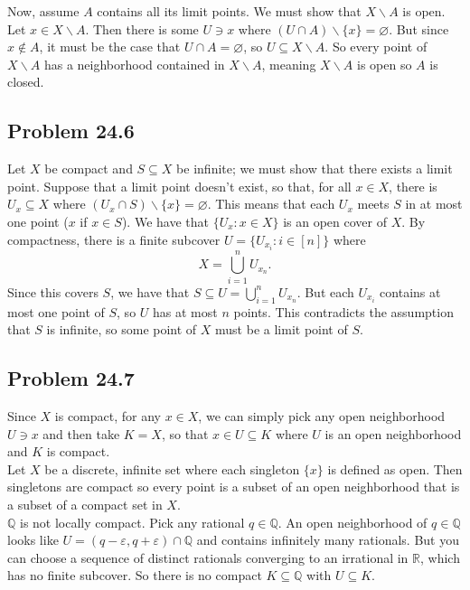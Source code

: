 \documentclass{article}
\newcommand{\R}{\mathbb{R}}
\newcommand{\Q}{\mathbb{Q}}
\newcommand{\eps}{\varepsilon}
\newcommand{\nullset}{\varnothing}
\newcommand{\minus}{\backslash}
\begin{document}
Now, assume $A$ contains all its limit points. We must show that $X \minus A$ is open. Let $x \in X \minus A$. Then there is some $U \ni x$ where $(U \cap A) \minus \{x\} = \nullset$. But since $x \not\in A$, it must be the case that $U \cap A = \nullset$, so $U \subseteq X \minus A$. So every point of $X \minus A$ has a neighborhood contained in $X \minus A$, meaning $X \minus A$ is open so $A$ is closed.

\subsection*{Problem 24.6}
Let $X$ be compact and $S \subseteq X$ be infinite; we must show that there exists a limit point. Suppose that a limit point doesn't exist, so that, for all $x \in X$, there is $U_x \subseteq X$ where $(U_x \cap S) \minus \{x\} = \nullset$. This means that each $U_x$ meets $S$ in at most one point ($x$ if $x \in S$). We have that $\{U_x: x \in X\}$ is an open cover of $X$. By compactness, there is a finite subcover $U = \{U_{x_i}: i \in [n]\}$ where
$$X = \bigcup_{i = 1}^n U_{x_n}.$$
Since this covers $S$, we have that $S \subseteq U = \bigcup_{i = 1}^n U_{x_n}$. But each $U_{x_i}$ contains at most one point of $S$, so $U$ has at most $n$ points. This contradicts the assumption that $S$ is infinite, so some point of $X$ must be a limit point of $S$.

\subsection*{Problem 24.7}
Since $X$ is compact, for any $x \in X$, we can simply pick any open neighborhood $U \ni x$ and then take $K = X$, so that $x \in U \subseteq K$ where $U$ is an open neighborhood and $K$ is compact. \\

Let $X$ be a discrete, infinite set where each singleton $\{x\}$ is defined as open. Then singletons are compact so every point is a subset of an open neighborhood that is a subset of a compact set in $X$. \\

$\Q$ is not locally compact. Pick any rational $q \in \Q$. An open neighborhood of $q \in \Q$ looks like $U = (q - \eps, q + \eps) \cap \Q$ and contains infinitely many rationals. But you can choose a sequence of distinct rationals converging to an irrational in $\R$, which has no finite subcover. So there is no compact $K \subseteq \Q$ with $U \subseteq K$. \\
\end{document}
